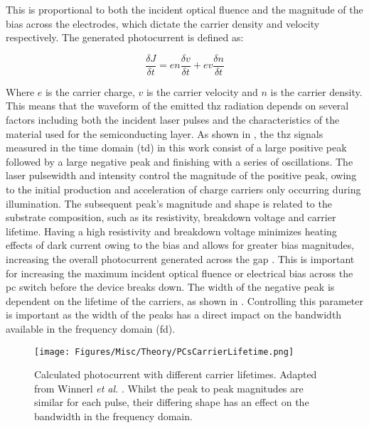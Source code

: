 This is proportional to both the incident optical fluence and the magnitude of the bias across the electrodes, which dictate the carrier density and velocity respectively. The generated photocurrent is defined as:

\begin{equation}
\frac{\delta J}{\delta t} = en\frac{\delta v}{\delta t} + ev\frac{\delta n}{\delta t}
\end{equation}

Where \(e\) is the carrier charge, \(v\) is the carrier velocity and \(n\) is the carrier density. This means that the waveform of the emitted \acrshort{thz} radiation depends on several factors including both the incident laser pulses and the characteristics of the material used for the semiconducting layer. As shown in , the \acrshort{thz} signals measured in the time domain (\acrshort{td}) in this work consist of a large positive peak followed by a large negative peak and finishing with a series of oscillations. The laser pulsewidth and intensity control the magnitude of the positive peak, owing to the initial production and acceleration of charge carriers only occurring during illumination. The subsequent peak's magnitude and shape is related to the substrate composition, such as its resistivity, breakdown voltage and carrier lifetime. Having a high resistivity and breakdown voltage minimizes heating effects of dark current owing to the bias and allows for greater bias magnitudes, increasing the overall photocurrent generated across the gap \DIFdelbegin \DIFdel{~}\DIFdelend \cite{Warren1991, Tani1997_2}. This is important for increasing the maximum incident optical fluence or electrical bias across the \acrshort{pc} switch before the device breaks down. The width of the negative peak is dependent on the lifetime of the carriers, as shown in . Controlling this parameter is important as the width of the peaks has a direct impact on the bandwidth available in the frequency domain (\acrshort{fd}).

\begin{figure}[t]
    \centering
    \texttt{[image: Figures/Misc/Theory/PCsCarrierLifetime.png]}
    \captionsetup{font = footnotesize, justification = centering}
    \caption[Calculated Photocurrent with Different Carrier Lifetimes]{Calculated photocurrent with different carrier lifetimes. Adapted from Winnerl \textit{et al.} \DIFdelbeginFL \DIFdelFL{~}\DIFdelendFL \cite{Winnerl2008}. Whilst the peak to peak magnitudes are similar for each pulse, their differing shape has an effect on the bandwidth in the frequency domain.}
    \label{fig:PCCarrierLifetime}
\end{figure}

